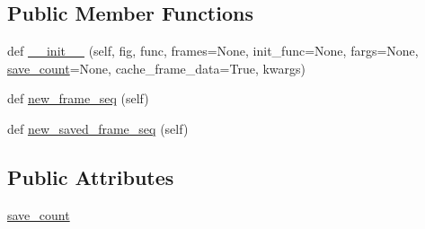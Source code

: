 \subsection*{Public Member Functions}
\begin{DoxyCompactItemize}
\item 
def \hyperlink{classmatplotlib_1_1animation_1_1FuncAnimation_ab3f83d2945e80b4ba681bc0acef28e7f}{\+\_\+\+\_\+init\+\_\+\+\_\+} (self, fig, func, frames=None, init\+\_\+func=None, fargs=None, \hyperlink{classmatplotlib_1_1animation_1_1FuncAnimation_a6d11b6844fe1906cf3048f9cd0cab8ea}{save\+\_\+count}=None, cache\+\_\+frame\+\_\+data=True, kwargs)
\item 
def \hyperlink{classmatplotlib_1_1animation_1_1FuncAnimation_a819b80ef9a05864cd4f4d68df9e9aa06}{new\+\_\+frame\+\_\+seq} (self)
\item 
def \hyperlink{classmatplotlib_1_1animation_1_1FuncAnimation_a790029ef3ba3bd1bcdd229176960ad15}{new\+\_\+saved\+\_\+frame\+\_\+seq} (self)
\end{DoxyCompactItemize}
\subsection*{Public Attributes}
\begin{DoxyCompactItemize}
\item 
\hyperlink{classmatplotlib_1_1animation_1_1FuncAnimation_a6d11b6844fe1906cf3048f9cd0cab8ea}{save\+\_\+count}
\end{DoxyCompactItemize}



